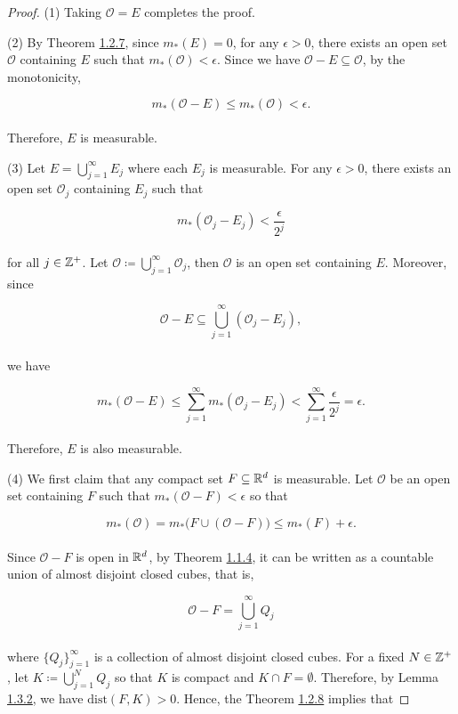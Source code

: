 \documentclass[12pt, a4paper, openany, twoside]{book}
\theoremstyle{definition}
\theoremstyle{remark}
\theoremstyle{plain}
\numberwithin{equation}{section}
\begin{document}
\begin{proof}
    (1) Taking $\mathcal{O}=E$ completes the proof.

    \vspace{5mm}
    (2) By Theorem \hyperref[Theorem 1.2.7]{1.2.7}, since $m_*(E)=0$, for any $\epsilon>0$, there exists an open set $\mathcal{O}$ containing $E$ such that $m_*(\mathcal{O})<\epsilon$. Since we have $\mathcal{O}-E\subseteq\mathcal{O}$, by the monotonicity, 

    \[m_*(\mathcal{O}-E)\leq m_*(\mathcal{O})<\epsilon.\]
    \\
    Therefore, $E$ is measurable.

    \vspace{5mm}
    (3) Let $E=\bigcup_{j=1}^{\infty}{E_j}$ where each $E_j$ is measurable. For any $\epsilon>0$, there exists an open set $\mathcal{O}_j$ containing $E_j$ such that 

    \[m_*(\mathcal{O}_j-E_j)<\frac{\epsilon}{2^j}\]
    \\
    for all $j\in{\mathbb {Z}}^+$. Let $\mathcal{O}\coloneqq\bigcup_{j=1}^{\infty}{\mathcal{O}_j}$, then $\mathcal{O}$ is an open set containing $E$. Moreover, since 

    \[\mathcal{O}-E\subseteq\bigcup_{j=1}^{\infty}{(\mathcal{O}_j-E_j)},\]
    \\
    we have 

    \[m_*(\mathcal{O}-E)\leq \sum_{j=1}^{\infty}{m_*(\mathcal{O}_j-E_j)}<\sum_{j=1}^{\infty}{\frac{\epsilon}{2^j}}=\epsilon.\]
    \\
    Therefore, $E$ is also measurable.

    \vspace{5mm}
    (4) We first claim that any compact set $F\subseteq{\mathbb {R}}^d$ is measurable. Let $\mathcal{O}$ be an open set containing $F$ such that $m_*(\mathcal{O}-F)<\epsilon$ so that 

    \[m_*(\mathcal{O})=m_*\big(F\cup(\mathcal{O}-F)\big)\leq m_*(F)+\epsilon.\]
    \\
    Since $\mathcal{O}-F$ is open in ${\mathbb {R}}^d$, by Theorem \hyperref[Theorem 1.1.4]{1.1.4}, it can be written as a countable union of almost disjoint closed cubes, that is,

    \[\mathcal{O}-F=\bigcup_{j=1}^{\infty}{Q_j}\]
    \\
    where $\{Q_j\}_{j=1}^{\infty}$ is a collection of almost disjoint closed cubes. For a fixed $N\in{\mathbb {Z}}^+$, let $K\coloneqq\bigcup_{j=1}^{N}{Q_j}$ so that $K$ is compact and $K\cap F=\emptyset$. Therefore, by Lemma \hyperref[Lemma 1.3.2]{1.3.2}, we have $\mathrm{dist}(F,K)>0$. Hence, the Theorem \hyperref[Theorem 1.2.8]{1.2.8} implies that


\end{proof}
\end{document}
